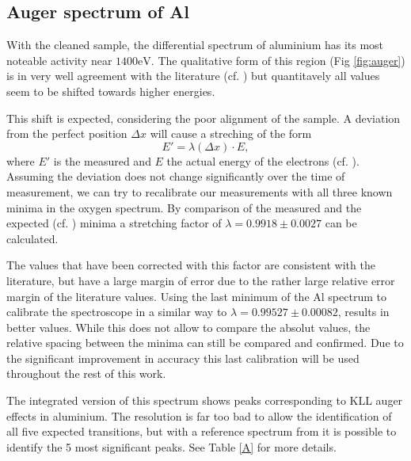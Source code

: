 \documentclass[a4paper]{scrartcl}
\numberwithin{equation}{section}
\numberwithin{figure}{section}
\numberwithin{table}{section}
\newcommand{\eq}[2]{\begin{equation}#1\label{#2}\end{equation}}
\begin{document}
\subsection{Auger spectrum of Al}
With the cleaned sample, the differential spectrum of aluminium has its most noteable activity near $1400\text{eV}$. The qualitative form of this region (Fig \ref{fig:auger}) is in very well agreement with the literature (cf. \cite{handbook}) but quantitavely all values seem to be shifted towards higher energies.

This shift is expected, considering the poor alignment of the sample. A deviation from the perfect position $\Delta x$ will cause a streching of the form
\eq{E' = \lambda (\Delta x) \cdot E,}{}
where $E'$ is the measured and $E$ the actual energy of the electrons (cf. \cite{zangwill}). Assuming the deviation does not change significantly over the time of measurement, we can try to recalibrate our measurements with all three known minima in the oxygen spectrum. By comparison of the measured and the expected (cf. \cite{handbook}) minima a stretching factor of $\lambda=0.9918\pm 0.0027$ can be calculated. 

The values that have been corrected with this factor are consistent with the literature, but have a large margin of error due to the rather large relative error margin of the literature values. Using the last minimum of the Al spectrum to calibrate the spectroscope in a similar way to $\lambda=0.99527\pm 0.00082$, results in better values. While this does not allow to compare the absolut values, the relative spacing between the minima can still be compared and confirmed. Due to the significant improvement in accuracy this last calibration will be used throughout the rest of this work.



The integrated version of this spectrum shows peaks corresponding to KLL auger effects in aluminium. The resolution is far too bad to allow the identification of all five expected transitions, but with a reference spectrum from \cite{paper} it is possible to identify the 5 most significant peaks. See Table \ref{A} for more details.
\end{document}
